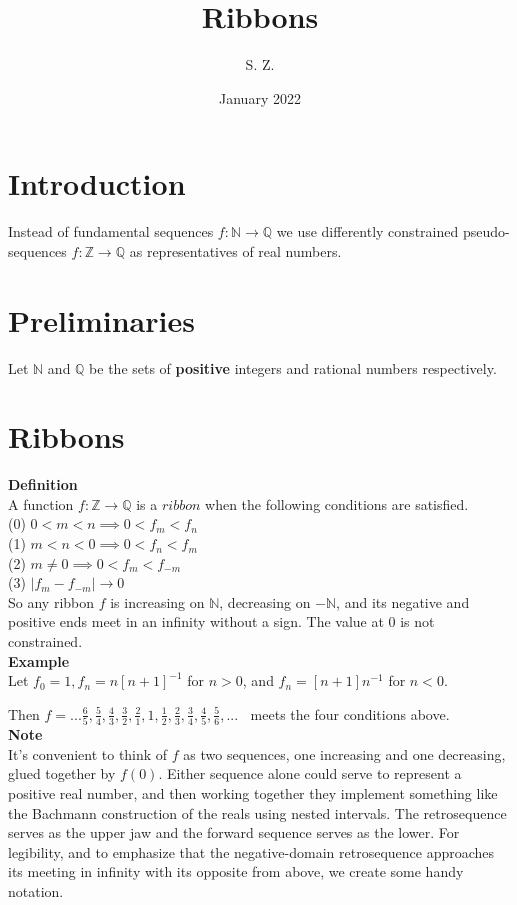 \documentclass{article}
\title{Ribbons}
\author{S. Z. }
\date{January 2022}
\newcommand{\nat}{ \mathbb{N}}
\newcommand{\rat}{ \mathbb{Q}}
\newcommand{\zee}{ \mathbb{Z}}
\newcommand{\sing}{ ribbon}
\begin{document}
\maketitle

\section{Introduction}
Instead of fundamental sequences $f : \nat \to \rat$ we use differently constrained pseudo-sequences $f : \zee \to \rat$ as representatives of real numbers. 

\section{Preliminaries}

Let $\nat$ and $\rat$ be the sets of \textbf{positive} integers and rational numbers respectively.\\

\section{Ribbons}

\textbf{Definition}\\
A function $f : \zee \to \rat$ is a \textbf{$\sing$} when the following conditions are satisfied.\\

(0) $ 0 < m < n \implies 0 < f_m < f_n$\\
(1) $ m < n < 0 \implies 0 < f_n < f_m$\\
(2) $ m \ne 0 \implies 0 < f_m < f_{-m}$\\
(3) $ |f_{m} - f_{-m}| \to 0 $\\

So any ribbon $f$ is increasing on $\nat$, decreasing on $-\nat$, and its negative and positive ends meet in an infinity without a sign. The value at $0$ is not constrained.\\

\textbf{Example}\\
Let $f_0 = 1, f_n = n[n+1]^{-1}$ for $n > 0$, and $f_n = [n+1]n^{-1}$ for $n < 0$.

Then  $f = ...\frac{6}{5},\frac{5}{4},\frac{4}{3},\frac{3}{2},\frac{2}{1},1,\frac{1}{2},\frac{2}{3},\frac{3}{4},\frac{4}{5},\frac{5}{6},... \;\;$ meets the four conditions above.\\

\textbf{Note}\\
It's convenient to think of $f$ as two sequences, one increasing and one decreasing, glued together by $f(0)$. Either sequence alone could serve to represent a positive real number, and then working together they implement something like the Bachmann construction of the reals using nested intervals. The retrosequence serves as the upper jaw and the forward sequence serves as the lower. For legibility, and to emphasize that the negative-domain retrosequence approaches its meeting in infinity with its opposite from above, we create some handy notation.\\
\end{document}
